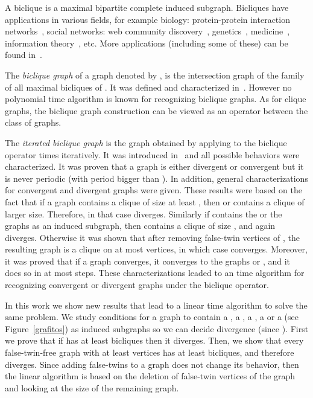 \documentclass[12pt]{article}
\begin{document}
A biclique is a maximal bipartite complete induced subgraph. Bicliques have applications in various fields, for example biology: protein-protein interaction networks~\cite{Bu01052003}, 
social networks: web community discovery~\cite{Kumar}, genetics~\cite{Atluri}, medicine~\cite{Niranjan}, information theory~\cite{Haemers200156}, etc. 
More applications (including some of these) can be found in~\cite{blablamec}.

The \emph{biclique graph} of a graph  denoted by , is the intersection graph of the family of all maximal bicliques of . 
It was defined and characterized in~\cite{GroshausSzwarcfiterJGT2010}. However no polynomial time algorithm is known for recognizing biclique graphs. 
As for clique graphs, the biclique graph construction can be viewed as an operator between the class of graphs. 

The \emph{iterated biclique graph}  is the graph obtained by applying to  the biclique operator   times iteratively. It was introduced in~\cite{marinayo} and all possible behaviors were characterized.
It was proven that a graph  is either divergent or convergent
but it is never periodic (with period bigger than ). In addition, general characterizations for 
convergent and divergent graphs were given. These results were based on the fact that if a graph  contains a clique of size at least , 
then  or  contains a clique of larger size. Therefore, in that case  diverges. Similarly if  contains the  or the  
graphs as an induced subgraph, then  
contains a clique of size , and again  diverges. Otherwise it was shown that after removing false-twin vertices of , the resulting graph is a clique on at most  vertices, in which case  converges. Moreover, it was proved that if a graph  converges, it converges to the graphs 
 or , and it does so in at most  steps. 
These characterizations leaded to an  time algorithm for recognizing convergent or divergent graphs under the biclique operator. 

In this work we show new results that lead to a linear time algorithm to
solve the same problem. We study conditions for a graph to contain a , a , 
a , a  or a  (see Figure~\ref{grafitos}) as induced subgraphs so we can decide
divergence (since  ). 
First we prove that if  has at least  bicliques then it diverges. 
Then, we show that every false-twin-free graph with at least  vertices has at least  bicliques, and therefore diverges.
Since adding false-twins to a graph does not change its  behavior, then the linear algorithm is based on the deletion of false-twin vertices of 
the graph and looking at the size of the remaining graph.  
\end{document}
